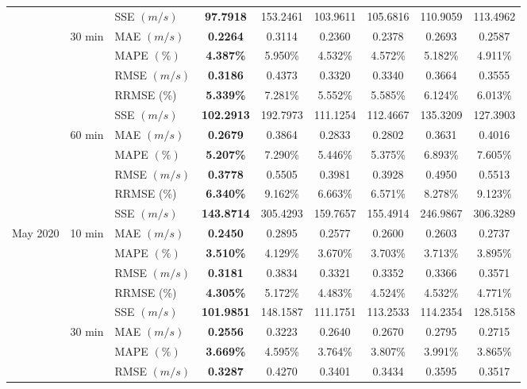 {\begin{longtable}[htb!]{lllcccccc}
 &  & {SSE {$(m/s)$}} & {\textbf{97.7918}} & {153.2461} & {103.9611} & {105.6816} & {110.9059} & {113.4962} \\
 & \multicolumn{1}{c}{30 min} & MAE {$(m/s)$} & \textbf{0.2264} & 0.3114 & 0.2360 & 0.2378 & 0.2693 & {0.2587} \\
 &  & MAPE {$(\%)$} & \textbf{4.387\%} & 5.950\% & 4.532\% & 4.572\% & 5.182\% & {4.911\%} \\
 &  & RMSE {$(m/s)$} & \textbf{0.3186} & 0.4373 & 0.3320 & 0.3340 & 0.3664 & {0.3555} \\
 &  & {RRMSE {(\%)}} & {\textbf{5.339\%}} & {7.281\%} & {5.552\%} & {5.585\%} & {6.124\%} & {6.013\%} \\
 &  & {SSE {$(m/s)$}} & {\textbf{102.2913}} & {192.7973} & {111.1254} & {112.4667} & {135.3209} & {127.3903} \\
 & \multicolumn{1}{c}{60 min} & MAE {$(m/s)$} & \textbf{0.2679} & 0.3864 & 0.2833 & 0.2802 & 0.3631 & {0.4016} \\
 &  & MAPE {$(\%)$} & \textbf{5.207\%} & 7.290\% & 5.446\% & 5.375\% & 6.893\% & {7.605\%} \\
 &  & RMSE {$(m/s)$} & \textbf{0.3778} & 0.5505 & 0.3981 & 0.3928 & 0.4950 & {0.5513} \\
 &  & {RRMSE {(\%)}} & {\textbf{6.340\%}} & {9.162\%} & {6.663\%} & {6.571\%} & {8.278\%} & {9.123\%} \\
 &  & {SSE {$(m/s)$}} & {\textbf{143.8714}} & {305.4293} & {159.7657} & {155.4914} & {246.9867} & {306.3289} \\ \hline
May 2020 & \multicolumn{1}{c}{10 min} & MAE {$(m/s)$} & \textbf{0.2450} & 0.2895 & 0.2577 & 0.2600 & 0.2603 & {0.2737} \\
 &  & MAPE {$(\%)$} & \textbf{3.510\%} & 4.129\% & 3.670\% & 3.703\% & 3.713\% & {3.895\%} \\
 &  & RMSE {$(m/s)$} & \textbf{0.3181} & 0.3834 & 0.3321 & 0.3352 & 0.3366 & {0.3571} \\
 &  & {RRMSE {(\%)}} & {\textbf{4.305\%}} & {5.172\%} & {4.483\%} & {4.524\%} & {4.532\%} & {4.771\%} \\
 &  & {SSE {$(m/s)$}} & {\textbf{101.9851}} & {148.1587} & {111.1751} & {113.2533} & {114.2354} & {128.5158} \\
 & \multicolumn{1}{c}{30 min} & MAE {$(m/s)$} & \textbf{0.2556} & 0.3223 & 0.2640 & 0.2670 & 0.2795 & {0.2715} \\
 &  & MAPE {$(\%)$} & \textbf{3.669\%} & 4.595\% & 3.764\% & 3.807\% & 3.991\% & {3.865\%} \\
 &  & RMSE {$(m/s)$} & \textbf{0.3287} & 0.4270 & 0.3401 & 0.3434 & 0.3595 & {0.3517} \\

\end{longtable}}
